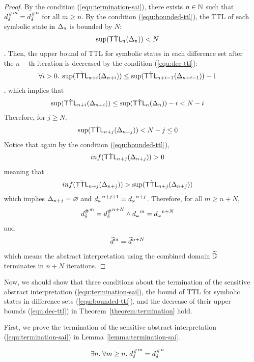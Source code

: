 \begin{proof}
  By the condition (\ref{equ:termination-sai}), there exists $n \in \mathbb{N}$
  such that ${{d}^{\#}_\delta}^m = {{d}^{\#}_\delta}^n$ for all $m \geq n$.  By the condition
  (\ref{equ:bounded-ttl}), the TTL of each symbolic state in $\Delta_n$ is
  bounded by $N$:
  \[
    \sup(\dot {\textsf{TTL}}_n(\Delta_n)) < N
  \].
  Then, the upper bound of TTL for symbolic states in each difference set after
  the $n-$th iteration is decreased by the condition (\ref{equ:dec-ttl}):
  \[
    \forall i > 0. \; \sup(\dot {\textsf{TTL}}_{n+i}(\Delta_{n+i})) \leq \sup(\dot
    {\textsf{TTL}}_{n+i-1}(\Delta_{n+i-1})) - 1
  \].
  which implies that
  \[
    \sup(\dot {\textsf{TTL}}_{n+i}(\Delta_{n+i})) \leq \sup(\dot {\textsf{TTL}}_n(\Delta_n)) - i < N - i
  \]
  Therefore, for $j \geq N$,
  \[
    \sup(\dot {\textsf{TTL}}_{n+j}(\Delta_{n+j})) < N - j \leq 0
  \]
  Notice that again by the condition (\ref{equ:bounded-ttl}),
  \[
    inf(\dot {\textsf{TTL}}_{n+j}(\Delta_{n+j})) > 0
  \]
  meaning that
  \[
    inf(\dot {\textsf{TTL}}_{n+j}(\Delta_{n+j})) > \sup(\dot {\textsf{TTL}}_{n+j}(\Delta_{n+j}))
  \]
  which implies $\Delta_{n+j} = \varnothing$ and ${{d}_\omega}^{n+j+1} =
  {{d}_\omega}^{n+j}$.
  Therefore, for all $m \geq n + N$,
  \[
    {{d}^{\#}_\delta}^m = {{d}^{\#}_\delta}^{n+N} \wedge {{d}_\omega}^m = {{d}_\omega}^{n+N}
  \]
  and
  \[
    \widetilde{d}^m = \widetilde{d}^{n+N}
  \]
  which means the abstract interpretation using the combined domain
  $\widetilde{\mathbb{D}}$ terminates in $n+N$ iterations.
\end{proof}

Now, we should show that three conditions about the termination of the sensitive
abstract interpretation (\ref{equ:termination-sai}), the bound of TTL for
symbolic states in difference sets (\ref{equ:bounded-ttl}), and the decrease of
their upper bounds (\ref{equ:dec-ttl}) in Theorem~\ref{theorem:termination}
hold.

First, we prove the termination of the sensitive abstract interpretation
(\ref{equ:termination-sai}) in Lemma~\ref{lemma:termination-sai}.

\begin{lemma}\label{lemma:sabs-term}
\label{lemma:termination-sai}
  \[
    \exists n. \; \forall m \geq n. \;
    {{d}^{\#}_\delta}^m = {{d}^{\#}_\delta}^n
  \]
\end{lemma}

